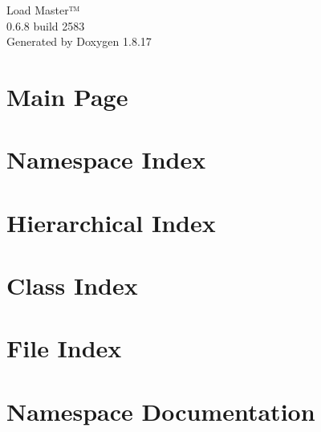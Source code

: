 \let\mypdfximage\pdfximage\def\pdfximage{\immediate\mypdfximage}\documentclass[twoside]{book}
\newcommand{\+}{\discretionary{\mbox{\scriptsize$\hookleftarrow$}}{}{}}
\newcommand{\clearemptydoublepage}{%
  \newpage{\pagestyle{empty}\cleardoublepage}%
}
\begin{document}
\hypersetup{pageanchor=false,
             bookmarksnumbered=true,
             pdfencoding=unicode
            }
\begin{titlepage}
\vspace*{7cm}
\begin{center}%
{\Large Load Master™ \\[1ex]\large 0.\+6.\+8 build 2583 }\\
\vspace*{1cm}
{\large Generated by Doxygen 1.8.17}\\
\end{center}
\end{titlepage}
\clearemptydoublepage
{}
\tableofcontents
\clearemptydoublepage
{}
\hypersetup{pageanchor=true}

\chapter{Main Page}
\label{index}\hypertarget{index}{}
\chapter{Namespace Index}

\chapter{Hierarchical Index}

\chapter{Class Index}

\chapter{File Index}

\chapter{Namespace Documentation}

















\end{document}
